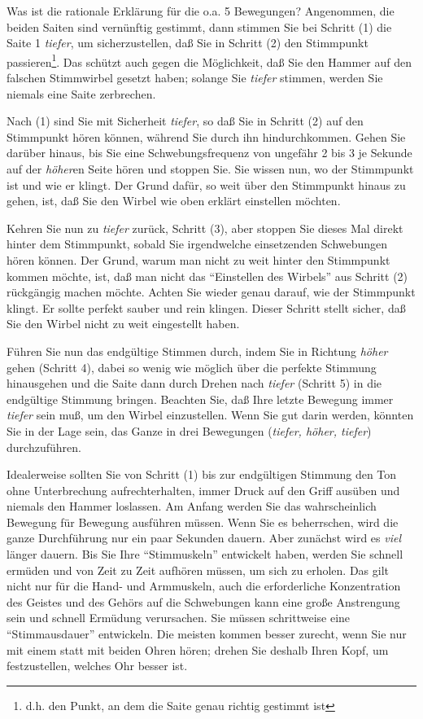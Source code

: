 Was ist die rationale Erklärung für die o.a. 5 Bewegungen?
Angenommen, die beiden Saiten sind vernünftig gestimmt, dann stimmen Sie bei Schritt (1) die Saite 1 \textit{tiefer}, um sicherzustellen, daß Sie in Schritt (2) den Stimmpunkt passieren\footnote{d.h. den Punkt, an dem die Saite genau richtig gestimmt ist}.
Das schützt auch gegen die Möglichkeit, daß Sie den Hammer auf den falschen Stimmwirbel gesetzt haben; solange Sie \textit{tiefer} stimmen, werden Sie niemals eine Saite zerbrechen.

Nach (1) sind Sie mit Sicherheit \textit{tiefer}, so daß Sie in Schritt (2) auf den Stimmpunkt hören können, während Sie durch ihn hindurchkommen.
Gehen Sie darüber hinaus, bis Sie eine Schwebungsfrequenz von ungefähr 2 bis 3 je Sekunde auf der \textit{höher}en Seite hören und stoppen Sie.
Sie wissen nun, wo der Stimmpunkt ist und wie er klingt.
Der Grund dafür, so weit über den Stimmpunkt hinaus zu gehen, ist, daß Sie den Wirbel wie oben erklärt einstellen möchten.

Kehren Sie nun zu \textit{tiefer} zurück, Schritt (3), aber stoppen Sie dieses Mal direkt hinter dem Stimmpunkt, sobald Sie irgendwelche einsetzenden Schwebungen hören können.
Der Grund, warum man nicht zu weit hinter den Stimmpunkt kommen möchte, ist, daß man nicht das \enquote{Einstellen des Wirbels} aus Schritt (2) rückgängig machen möchte.
Achten Sie wieder genau darauf, wie der Stimmpunkt klingt.
Er sollte perfekt sauber und rein klingen.
Dieser Schritt stellt sicher, daß Sie den Wirbel nicht zu weit eingestellt haben.

Führen Sie nun das endgültige Stimmen durch, indem Sie in Richtung \textit{höher} gehen (Schritt 4), dabei so wenig wie möglich über die perfekte Stimmung hinausgehen und die Saite dann durch Drehen nach \textit{tiefer} (Schritt 5) in die endgültige Stimmung bringen.
Beachten Sie, daß Ihre letzte Bewegung immer \textit{tiefer} sein muß, um den Wirbel einzustellen.
Wenn Sie gut darin werden, könnten Sie in der Lage sein, das Ganze in drei Bewegungen (\textit{tiefer, höher, tiefer}) durchzuführen.

Idealerweise sollten Sie von Schritt (1) bis zur endgültigen Stimmung den Ton ohne Unterbrechung aufrechterhalten, immer Druck auf den Griff ausüben und niemals den Hammer loslassen.
Am Anfang werden Sie das wahrscheinlich Bewegung für Bewegung ausführen müssen.
Wenn Sie es beherrschen, wird die ganze Durchführung nur ein paar Sekunden dauern.
Aber zunächst wird es \textit{viel} länger dauern.
Bis Sie Ihre \enquote{Stimmuskeln} entwickelt haben, werden Sie schnell ermüden und von Zeit zu Zeit aufhören müssen, um sich zu erholen.
Das gilt nicht nur für die Hand- und Armmuskeln, auch die erforderliche Konzentration des Geistes und des Gehörs auf die Schwebungen kann eine große Anstrengung sein und schnell Ermüdung verursachen.
Sie müssen schrittweise eine \enquote{Stimmausdauer} entwickeln.
Die meisten kommen besser zurecht, wenn Sie nur mit einem statt mit beiden Ohren hören; drehen Sie deshalb Ihren Kopf, um festzustellen, welches Ohr besser ist.

